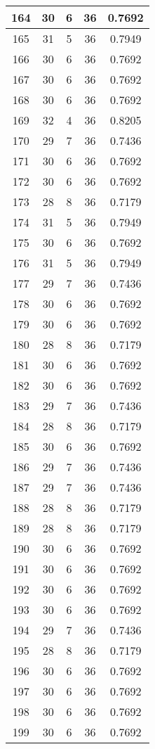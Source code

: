 \documentclass[letterpaper, 12pt]{article}
\begin{document}
\begin{longtable}{|c|c|c|c|c|}
\hline
164 & 30 & 6 & 36 & 0.7692 \\
\hline
165 & 31 & 5 & 36 & 0.7949 \\
\hline
166 & 30 & 6 & 36 & 0.7692 \\
\hline
167 & 30 & 6 & 36 & 0.7692 \\
\hline
168 & 30 & 6 & 36 & 0.7692 \\
\hline
169 & 32 & 4 & 36 & 0.8205 \\
\hline
170 & 29 & 7 & 36 & 0.7436 \\
\hline
171 & 30 & 6 & 36 & 0.7692 \\
\hline
172 & 30 & 6 & 36 & 0.7692 \\
\hline
173 & 28 & 8 & 36 & 0.7179 \\
\hline
174 & 31 & 5 & 36 & 0.7949 \\
\hline
175 & 30 & 6 & 36 & 0.7692 \\
\hline
176 & 31 & 5 & 36 & 0.7949 \\
\hline
177 & 29 & 7 & 36 & 0.7436 \\
\hline
178 & 30 & 6 & 36 & 0.7692 \\
\hline
179 & 30 & 6 & 36 & 0.7692 \\
\hline
180 & 28 & 8 & 36 & 0.7179 \\
\hline
181 & 30 & 6 & 36 & 0.7692 \\
\hline
182 & 30 & 6 & 36 & 0.7692 \\
\hline
183 & 29 & 7 & 36 & 0.7436 \\
\hline
184 & 28 & 8 & 36 & 0.7179 \\
\hline
185 & 30 & 6 & 36 & 0.7692 \\
\hline
186 & 29 & 7 & 36 & 0.7436 \\
\hline
187 & 29 & 7 & 36 & 0.7436 \\
\hline
188 & 28 & 8 & 36 & 0.7179 \\
\hline
189 & 28 & 8 & 36 & 0.7179 \\
\hline
190 & 30 & 6 & 36 & 0.7692 \\
\hline
191 & 30 & 6 & 36 & 0.7692 \\
\hline
192 & 30 & 6 & 36 & 0.7692 \\
\hline
193 & 30 & 6 & 36 & 0.7692 \\
\hline
194 & 29 & 7 & 36 & 0.7436 \\
\hline
195 & 28 & 8 & 36 & 0.7179 \\
\hline
196 & 30 & 6 & 36 & 0.7692 \\
\hline
197 & 30 & 6 & 36 & 0.7692 \\
\hline
198 & 30 & 6 & 36 & 0.7692 \\
\hline
199 & 30 & 6 & 36 & 0.7692 \\
\hline
\end{longtable}
\end{document}
